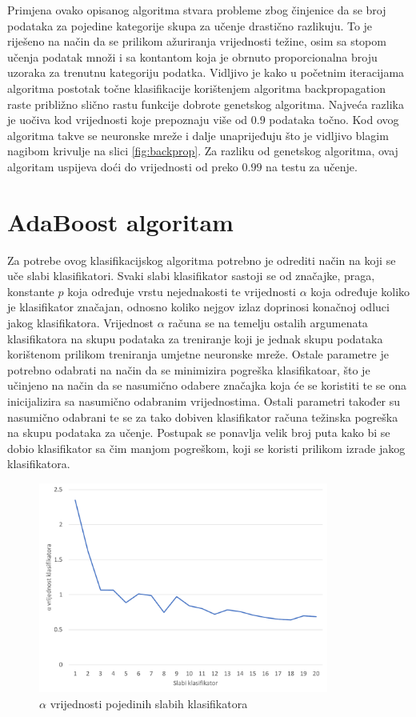 \documentclass[times, utf8, zavrsni, numeric]{fer}
\begin{document}
Primjena ovako opisanog algoritma stvara probleme zbog činjenice da se broj podataka za pojedine kategorije skupa za učenje drastično razlikuju.
To je riješeno na način da se prilikom ažuriranja vrijednosti težine, osim sa stopom učenja podatak množi i sa kontantom koja je obrnuto proporcionalna broju uzoraka za trenutnu kategoriju podatka.
Vidljivo je kako u početnim iteracijama algoritma postotak točne klasifikacije korištenjem algoritma backpropagation raste približno slično rastu funkcije dobrote genetskog algoritma.
Najveća razlika je uočiva kod vrijednosti koje prepoznaju više od $0.9$ podataka točno.
Kod ovog algoritma takve se neuronske mreže i dalje unaprijeđuju što je vidljivo blagim nagibom krivulje na slici \ref{fig:backprop}.
Za razliku od genetskog algoritma, ovaj algoritam uspijeva doći do vrijednosti od preko $0.99$ na testu za učenje.

\section{AdaBoost algoritam}
Za potrebe ovog klasifikacijskog algoritma potrebno je odrediti način na koji se uče slabi klasifikatori.
Svaki slabi klasifikator sastoji se od značajke, praga, konstante $p$ koja određuje vrstu nejednakosti te vrijednosti $\alpha$ koja određuje koliko je klasifikator značajan, odnosno koliko nejgov izlaz doprinosi konačnoj odluci jakog klasifikatora.
Vrijednost $\alpha$ računa se na temelju ostalih argumenata klasifikatora na skupu podataka za treniranje koji je jednak skupu podataka korištenom prilikom treniranja umjetne neuronske mreže.
Ostale parametre je potrebno odabrati na način da se minimizira pogreška klasifikatoar, što je učinjeno na način da se nasumično odabere značajka koja će se koristiti te se ona inicijalizira sa nasumično odabranim vrijednostima.
Ostali parametri također su nasumično odabrani te se za tako dobiven klasifikator računa težinska pogreška na skupu podataka za učenje.
Postupak se ponavlja velik broj puta kako bi se dobio klasifikator sa čim manjom pogreškom, koji se koristi prilikom izrade jakog klasifikatora.
\begin{figure}[ht!]
    \centering
    \includegraphics[width=0.85\textwidth]{Images/Ada.pdf}
    \captionsetup{justification=centering}
    \caption{$\alpha$ vrijednosti pojedinih slabih klasifikatora}
    \label{fig:ada}
\end{figure}
\end{document}
